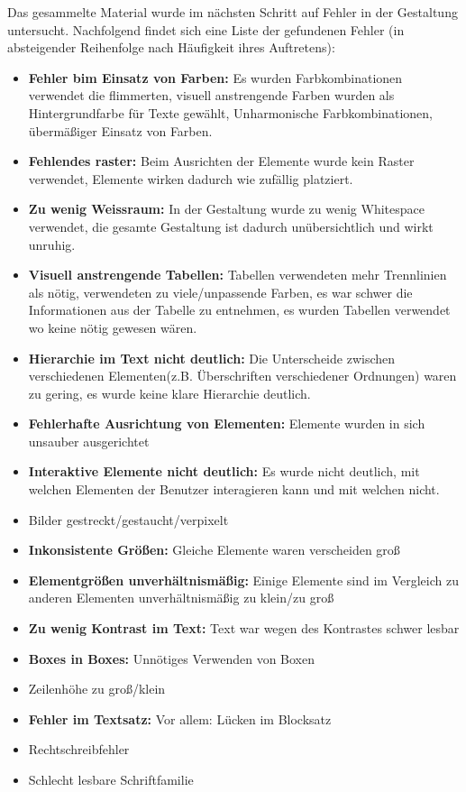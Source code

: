 Das gesammelte Material wurde im nächsten Schritt auf Fehler in der Gestaltung untersucht. Nachfolgend findet sich eine Liste der gefundenen Fehler (in absteigender Reihenfolge nach Häufigkeit ihres Auftretens):

\begin{itemize}
	\item \textbf{Fehler bim Einsatz von Farben:} Es wurden Farbkombinationen verwendet die flimmerten, visuell anstrengende Farben wurden als Hintergrundfarbe für Texte gewählt, Unharmonische Farbkombinationen, übermäßiger Einsatz von Farben.
	\item \textbf{Fehlendes raster:} Beim Ausrichten der Elemente wurde kein Raster verwendet, Elemente wirken dadurch wie zufällig platziert.
	\item \textbf{Zu wenig Weissraum:} In der Gestaltung wurde zu wenig Whitespace verwendet, die gesamte Gestaltung ist dadurch unübersichtlich und wirkt unruhig.
	\item \textbf{Visuell anstrengende Tabellen:} Tabellen verwendeten mehr Trennlinien als nötig, verwendeten zu viele/unpassende Farben, es war schwer die Informationen aus der Tabelle zu entnehmen, es wurden Tabellen verwendet wo keine nötig gewesen wären.
	\item \textbf{Hierarchie im Text nicht deutlich:} Die Unterscheide zwischen verschiedenen Elementen(z.B. Überschriften verschiedener Ordnungen) waren zu gering, es wurde keine klare Hierarchie deutlich.
	\item \textbf{Fehlerhafte Ausrichtung von Elementen:} Elemente wurden in sich unsauber ausgerichtet
	\item \textbf{Interaktive Elemente nicht deutlich:} Es wurde nicht deutlich, mit welchen Elementen der Benutzer interagieren kann und mit welchen nicht.
	\item Bilder gestreckt/gestaucht/verpixelt
	\item \textbf{Inkonsistente Größen:} Gleiche Elemente waren verscheiden groß
	\item \textbf{Elementgrößen unverhältnismäßig:} Einige Elemente sind im Vergleich zu anderen Elementen unverhältnismäßig zu klein/zu groß
	\item \textbf{Zu wenig Kontrast im Text:} Text war wegen des Kontrastes schwer lesbar
	\item \textbf{Boxes in Boxes:} Unnötiges Verwenden von Boxen
	\item Zeilenhöhe zu groß/klein
	\item \textbf{Fehler im Textsatz:} Vor allem: Lücken im Blocksatz
	\item Rechtschreibfehler
	\item Schlecht lesbare Schriftfamilie
\end{itemize}


